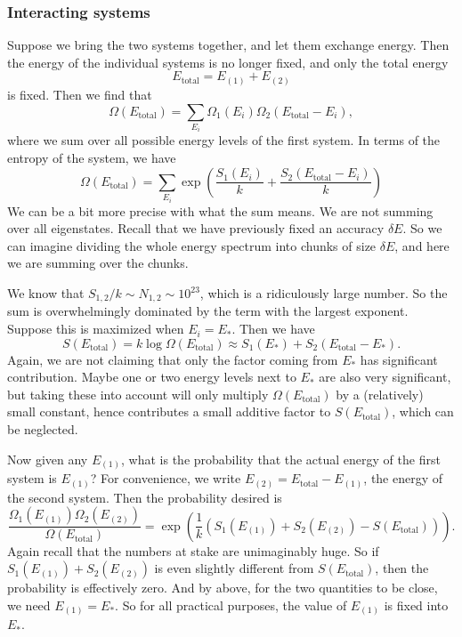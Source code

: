\documentclass[a4paper]{article}
\begin{document}
\subsubsection*{Interacting systems}
Suppose we bring the two systems together, and let them exchange energy. Then the energy of the individual systems is no longer fixed, and only the total energy
\[
  E_{\mathrm{total}} = E_{(1)} + E_{(2)}
\]
is fixed. Then we find that
\[
  \Omega(E_{\mathrm{total}}) = \sum_{E_i} \Omega_1(E_i) \Omega_2(E_{\mathrm{total}} - E_i),
\]
where we sum over all possible energy levels of the first system. In terms of the entropy of the system, we have
\[
  \Omega(E_{\mathrm{total}}) = \sum_{E_i} \exp\left(\frac{S_1(E_i)}{k} + \frac{S_2(E_{\mathrm{total}} - E_i)}{k}\right)
\]
We can be a bit more precise with what the sum means. We are not summing over all eigenstates. Recall that we have previously fixed an accuracy $\delta E$. So we can imagine dividing the whole energy spectrum into chunks of size $\delta E$, and here we are summing over the chunks.

We know that $S_{1, 2}/k \sim N_{1, 2} \sim 10^{23}$, which is a ridiculously large number. So the sum is overwhelmingly dominated by the term with the largest exponent. Suppose this is maximized when $E_i = E_*$. Then we have
\[
  S(E_{\mathrm{total}}) = k \log \Omega(E_{\mathrm{total}}) \approx S_1(E_*) + S_2(E_{\mathrm{total}} - E_*).
\]
Again, we are not claiming that only the factor coming from $E_*$ has significant contribution. Maybe one or two energy levels next to $E_*$ are also very significant, but taking these into account will only multiply $\Omega(E_{\mathrm{total}})$ by a (relatively) small constant, hence contributes a small additive factor to $S(E_{\mathrm{total}})$, which can be neglected.

Now given any $E_{(1)}$, what is the probability that the actual energy of the first system is $E_{(1)}$? For convenience, we write $E_{(2)} = E_{\mathrm{total}} - E_{(1)}$, the energy of the second system. Then the probability desired is
\[
  \frac{\Omega_1(E_{(1)})\Omega_2(E_{(2)})}{\Omega(E_{\mathrm{total}})} = \exp\left(\frac{1}{k}\left(S_1(E_{(1)}) + S_2(E_{(2)}) - S(E_{\mathrm{total}})\right)\right).
\]
Again recall that the numbers at stake are unimaginably huge. So if $S_1(E_{(1)}) + S_2(E_{(2)})$ is even slightly different from $S(E_{\mathrm{total}})$, then the probability is effectively zero. And by above, for the two quantities to be close, we need $E_{(1)} = E_*$. So for all practical purposes, the value of $E_{(1)}$ is fixed into $E_*$.
\end{document}
